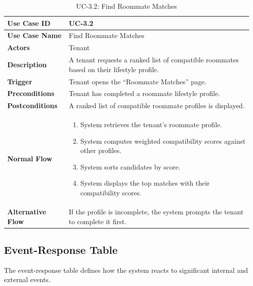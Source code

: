 \begin{table}[h]
\centering
\caption{UC-3.2: Find Roommate Matches}

\begin{tabularx}{\textwidth}{
|>{\raggedright\arraybackslash}p{3.5cm}
|>{\raggedright\arraybackslash}X|}

\hline
\textbf{Use Case ID} & UC-3.2 \\ \hline
\textbf{Use Case Name} & Find Roommate Matches \\ \hline
\textbf{Actors} & Tenant \\ \hline
\textbf{Description} & A tenant requests a ranked list of compatible roommates based on their lifestyle profile. \\ \hline
\textbf{Trigger} & Tenant opens the ``Roommate Matches'' page. \\ \hline
\textbf{Preconditions} & Tenant has completed a roommate lifestyle profile. \\ \hline
\textbf{Postconditions} & A ranked list of compatible roommate profiles is displayed. \\ \hline
\textbf{Normal Flow} &
\begin{enumerate}
    \item System retrieves the tenant's roommate profile.
    \item System computes weighted compatibility scores against other profiles.
    \item System sorts candidates by score.
    \item System displays the top matches with their compatibility scores.
\end{enumerate}
\\ \hline
\textbf{Alternative Flow} &
If the profile is incomplete, the system prompts the tenant to complete it first.
\\ \hline

\end{tabularx}

\end{table}

\subsection{Event-Response Table}

The event-response table defines how the system reacts to significant internal and external events.


